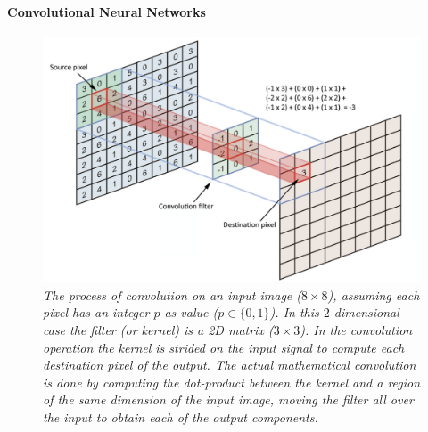 \documentclass[binding=0.6cm]{sapthesis}
\begin{document}

\paragraph{Convolutional Neural Networks}
\label{sec:bg.gnn.cnn}
\begin{figure}
    \includegraphics[width=\textwidth]{imgs/background/convolution_op.png}
    \caption{\textit{The process of convolution on an input image ($8 \times 8$), assuming each pixel has an integer $p$ as value ($p \in \{0,1\}$). In this $2$-dimensional case the filter (or kernel) is a 2D matrix ($3\times3$). In the convolution operation the kernel is strided on the input signal to compute each destination pixel of the output. The actual mathematical convolution is done by computing the dot-product between the kernel and a region of the same dimension of the input image, moving the filter all over the input to obtain each of the output components.}}
    \label{fig:bg.convolution}
\end{figure}
\end{document}
